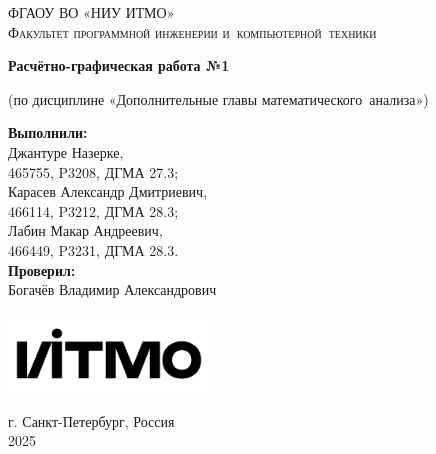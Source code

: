 \begin{titlepage}
    \begin{center}
        \large
        \textsc{ФГАОУ ВО «НИУ ИТМО»\\
        Факультет программной инженерии и~компьютерной~техники}
        \vspace*{4cm}
            
        \LARGE
        \textbf{Расчётно-графическая работа №1}
            
        \vspace{0.5cm}
        \large
        (по дисциплине «Дополнительные главы математического~анализа»)

        \vspace{1.5cm}

        \hfill\large
        \begin{minipage}{.55\textwidth}
        \textbf{Выполнили:}\\[2mm]
        Джантуре Назерке,\\
        465755, P3208, ДГМА 27.3;\\
        Карасев Александр Дмитриевич,\\
        466114, P3212, ДГМА 28.3;\\
        Лабин Макар Андреевич,\\
        466449, P3231, ДГМА 28.3.\\[2mm]
        \textbf{Проверил:}\\[2mm]
        Богачёв Владимир Александрович
        \end{minipage}%
            
        \vfill
            
        \vspace{0.8cm}
            
        \includegraphics[width=0.4\textwidth]{itmo}
            
        \Large
        г. Санкт-Петербург, Россия\\
        2025
            
    \end{center}
\end{titlepage}